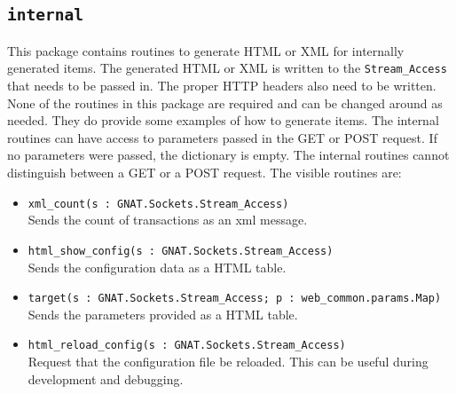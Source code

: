 \documentclass[10pt, openany, draft]{article}
\begin{document}
\subsection{\texttt{internal}}
This package contains routines to generate HTML or XML for internally generated items.  The generated HTML or XML is written to the \texttt{Stream\_Access} that needs to be passed in.  The proper HTTP headers also need to be written.  None of the routines in this package are required and can be changed around as needed.  They do provide some examples of how to generate items.  The internal routines can have access to parameters passed in the GET or POST request.  If no parameters were passed, the dictionary is empty.  The internal routines cannot distinguish between a GET or a POST request.  The visible routines are:
\begin{itemize}
  \item \verb|xml_count(s : GNAT.Sockets.Stream_Access)|\\
  Sends the count of transactions as an xml message.
  \item \verb|html_show_config(s : GNAT.Sockets.Stream_Access)|\\
  Sends the configuration data as a HTML table.
  \item \verb|target(s : GNAT.Sockets.Stream_Access; p : web_common.params.Map)|\\
  Sends the parameters provided as a HTML table.
  \item \verb|html_reload_config(s : GNAT.Sockets.Stream_Access)|\\
  Request that the configuration file be reloaded.  This can be useful during development and debugging.
\end{itemize}
\end{document}
